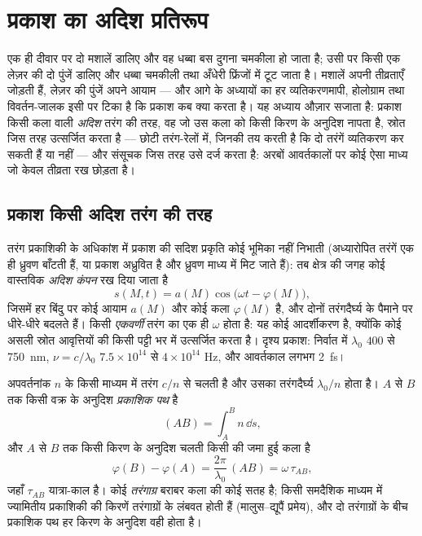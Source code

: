 \chapter{प्रकाश का अदिश प्रतिरूप}\label{ch:b2:scalar-light-model}

एक ही दीवार पर दो मशालें डालिए और वह धब्बा बस दुगना चमकीला हो जाता है;
उसी पर किसी एक लेज़र की दो पुंजें डालिए और धब्बा चमकीली तथा अँधेरी
फ्रिंजों में टूट जाता है। मशालें अपनी तीव्रताएँ जोड़ती हैं, लेज़र की
पुंजें अपने आयाम --- और आगे के अध्यायों का हर व्यतिकरणमापी, होलोग्राम तथा
विवर्तन-जालक इसी पर टिका है कि प्रकाश कब क्या करता है। यह अध्याय औज़ार
सजाता है: प्रकाश किसी कला वाली \emph{अदिश} तरंग की तरह, वह
\emph{} जो उस कला को किसी किरण के अनुदिश नापता है, स्रोत जिस
तरह उत्सर्जित करता है --- छोटी तरंग-रेलों में, जिनकी
\emph{} तय करती है कि दो तरंगें व्यतिकरण कर सकती हैं या नहीं ---
और संसूचक जिस तरह उसे दर्ज करता है: अरबों आवर्तकालों पर कोई ऐसा माध्य
जो केवल तीव्रता रख छोड़ता है।

\section{प्रकाश किसी अदिश तरंग की तरह}

\begin{definition}[अदिश प्रतिरूप; एकवर्णी तरंग]\label{def:b2:scalar-light-model:scalar}
तरंग प्रकाशिकी के अधिकांश में प्रकाश की सदिश प्रकृति कोई भूमिका नहीं
निभाती (अध्यारोपित तरंगें एक ही ध्रुवण बाँटती हैं, या प्रकाश अध्रुवित है
और ध्रुवण माध्य में मिट जाते हैं): तब क्षेत्र की जगह कोई वास्तविक
\emph{अदिश कंपन} रख दिया जाता है
\[
s(M, t) = a(M)\cos\bigl(\omega t - \varphi(M)\bigr) ,
\]
जिसमें हर बिंदु पर कोई आयाम $a(M)$ और कोई कला $\varphi(M)$ है, और दोनों
तरंगदैर्घ्य के पैमाने पर धीरे-धीरे बदलते हैं। किसी \emph{एकवर्णी}
तरंग का एक ही $\omega$ होता है: यह कोई आदर्शीकरण है, क्योंकि कोई असली स्रोत
आवृत्तियों की किसी पट्टी भर में उत्सर्जित करता है। दृश्य प्रकाश: निर्वात में $\lambda_0$
$400$ से \qty{750}{nm}, $\nu = c/\lambda_0$ $7.5 \times 10^{14}$ से $4 \times 10^{14}$ Hz,
और आवर्तकाल लगभग \qty{2}{fs}।
\end{definition}

\begin{definition}[प्रकाशिक पथ और कला]\label{def:b2:scalar-light-model:path}
अपवर्तनांक $n$ के किसी माध्यम में तरंग $c/n$ से चलती है और उसका तरंगदैर्घ्य
$\lambda_0/n$ होता है। $A$ से $B$ तक किसी वक्र के अनुदिश \emph{प्रकाशिक पथ} है
\[
(AB) = \int_A^Bn\,\dd s ,
\]
और $A$ से $B$ तक किसी किरण के अनुदिश चलती किसी  की जमा हुई
कला है
\[
\varphi(B) - \varphi(A) = \frac{2\pi}{\lambda_0}\,(AB) = \omega\,\tau_{AB} ,
\]
जहाँ $\tau_{AB}$ यात्रा-काल है। कोई \emph{तरंगाग्र} बराबर कला की कोई
सतह है; किसी समदैशिक माध्यम में ज्यामितीय प्रकाशिकी की किरणें तरंगाग्रों के
लंबवत होती हैं (मालुस--द्यूपैं प्रमेय), और दो तरंगाग्रों के बीच प्रकाशिक
पथ हर किरण के अनुदिश वही होता है।
\end{definition}

